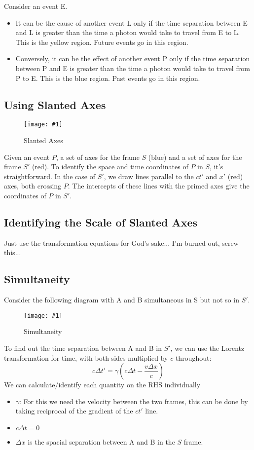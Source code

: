 \documentclass[a4paper,12pt]{article}
\newcommand{\img}[4]{\begin{center}
  \begin{figure}[H]
    \centering
    \texttt{[image: \#1]}
    \caption{#3}
    \label{fig:#4}
  \end{figure}
\end{center}}
\newcommand{\paren}[1]{\left(#1\right)}
\begin{document}
Consider an event E.
\begin{itemize}
  \item It can be the cause of another event L only if  the time separation between E and L is greater than the time a photon would take to travel from E to L. This is the \textcolor{yellow!60!black!100}{yellow region}. Future events go in this region.
  \item Conversely, it can be the effect of another event P only if the time separation between P and E is greater than the time a photon would take to travel from P to E. This is the \textcolor{blue!60!black!100}{blue region}. Past events go in this region.
\end{itemize}

\subsection{Using Slanted Axes}

\img{slantedaxes.png}{0.6}{Slanted Axes}{slantedaxes}

Given an event $P$, a set of axes for the frame $S$ (blue) and a set of axes for the frame $S'$ (red). To identify the space and time coordinates of $P$ in $S$, it's straightforward. In the case of $S'$, we draw lines parallel to the $ct'$ and $x'$ (red) axes, both crossing $P$. The intercepts of these lines with the primed axes give the coordinates of $P$ in $S'$.

\subsection{Identifying the Scale of Slanted Axes}

Just use the transformation equations for God's sake... I'm burned out, screw this...

\pagebreak

\subsection{Simultaneity}

Consider the following diagram with A and B simultaneous in S but not so in $S'$.

\img{diagramsimul.png}{0.6}{Simultaneity}{diagramsimul}

To find out the time separation between A and B in $S'$, we can use the Lorentz transformation for time, with both sides multiplied by $c$ throughout:
$$c\Delta t' = \gamma\paren{c\Delta t - \dfrac{v\Delta x}{c}}$$
We can calculate/identify each quantity on the RHS individually
\begin{itemize}
  \item $\gamma$: For this we need the velocity between the two frames, this can be done by taking reciprocal of the gradient of the $ct'$ line.
  \item $c\Delta t = 0$
  \item $\Delta x$ is the spacial separation between A and B in the $S$ frame.
\end{itemize}
\end{document}
